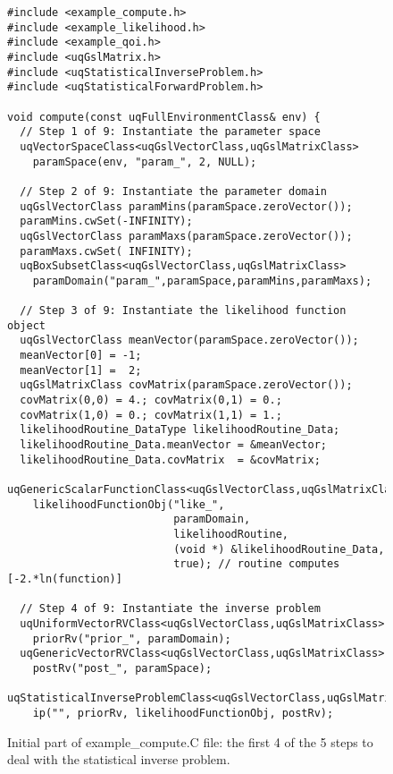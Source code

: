 \begin{figure}[h!]
\begin{center}
\begin{verbatim}
#include <example_compute.h>
#include <example_likelihood.h>
#include <example_qoi.h>
#include <uqGslMatrix.h>
#include <uqStatisticalInverseProblem.h>
#include <uqStatisticalForwardProblem.h>

void compute(const uqFullEnvironmentClass& env) {
  // Step 1 of 9: Instantiate the parameter space
  uqVectorSpaceClass<uqGslVectorClass,uqGslMatrixClass>
    paramSpace(env, "param_", 2, NULL);

  // Step 2 of 9: Instantiate the parameter domain
  uqGslVectorClass paramMins(paramSpace.zeroVector());
  paramMins.cwSet(-INFINITY);
  uqGslVectorClass paramMaxs(paramSpace.zeroVector());
  paramMaxs.cwSet( INFINITY);
  uqBoxSubsetClass<uqGslVectorClass,uqGslMatrixClass>
    paramDomain("param_",paramSpace,paramMins,paramMaxs);

  // Step 3 of 9: Instantiate the likelihood function object
  uqGslVectorClass meanVector(paramSpace.zeroVector());
  meanVector[0] = -1;
  meanVector[1] =  2;
  uqGslMatrixClass covMatrix(paramSpace.zeroVector());
  covMatrix(0,0) = 4.; covMatrix(0,1) = 0.;
  covMatrix(1,0) = 0.; covMatrix(1,1) = 1.;
  likelihoodRoutine_DataType likelihoodRoutine_Data;
  likelihoodRoutine_Data.meanVector = &meanVector;
  likelihoodRoutine_Data.covMatrix  = &covMatrix;
  uqGenericScalarFunctionClass<uqGslVectorClass,uqGslMatrixClass>
    likelihoodFunctionObj("like_",
                          paramDomain,
                          likelihoodRoutine,
                          (void *) &likelihoodRoutine_Data,
                          true); // routine computes [-2.*ln(function)]

  // Step 4 of 9: Instantiate the inverse problem
  uqUniformVectorRVClass<uqGslVectorClass,uqGslMatrixClass>
    priorRv("prior_", paramDomain);
  uqGenericVectorRVClass<uqGslVectorClass,uqGslMatrixClass>
    postRv("post_", paramSpace);
  uqStatisticalInverseProblemClass<uqGslVectorClass,uqGslMatrixClass>
    ip("", priorRv, likelihoodFunctionObj, postRv);
\end{verbatim}
\end{center}
\caption{
Initial part of example\_compute.C file: the first 4 of the 5 steps to deal with the statistical inverse problem.
}
\label{fig-compute-c1}
\end{figure}

